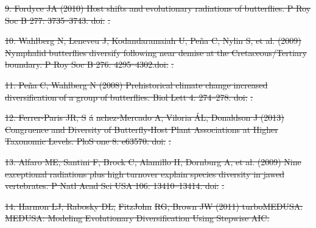 \documentclass[10pt]{article}
\providecommand{\DIFdeltex}[1]{{\protect\color{red}\sout{#1}}}                      %
\providecommand{\DIFaddbegin}{} %
\providecommand{\DIFaddend}{} %
\providecommand{\DIFdelend}{} %
\providecommand{\DIFdel}[1]{\texorpdfstring{\DIFdeltex{#1}}{}} %
\begin{document}
\DIFdel{9. Fordyce JA (2010) Host shifts and evolutionary radiations of
butterflies. P Roy Soc B 277: 3735--3743.
doi:}%
\DIFdel{.
}%

\DIFdel{10. Wahlberg N, Leneveu J, Kodandaramaiah U, Peña C, Nylin S, et al.
(2009) Nymphalid butterflies diversify following near demise at the
Cretaceous/Tertiary boundary. P Roy Soc B 276: 4295--4302.doi:}%
\DIFdel{.}%

\DIFdel{11. Peña C, Wahlberg N (2008)                                         Prehistorical climate change increased
diversification of a group of butterflies. Biol Lett 4: 274--278.
doi:}%
\DIFdel{.
}%

\DIFdel{12. Ferrer-Paris JR, S}%
\DIFdel{á}%
\DIFdel{nchez-Mercado A, Viloria ÁL, Donaldson J (2013)
Congruence and Diversity of Butterfly-Host Plant Associations at Higher
Taxonomic Levels. PloS one 8: e63570.
doi:}%
\DIFdel{.
}%

\DIFdel{13. Alfaro ME, Santini F, Brock C, Alamillo H, Dornburg A, et al. (2009)
Nine exceptional radiations plus high turnover explain species diversity
in jawed vertebrates. P Natl Acad Sci USA 106: 13410--13414.
doi:}%
\DIFdel{.
}%

\DIFdel{14. Harmon LJ, Rabosky DL, }%
\DIFdel{FitzJohn}%
\DIFdel{RG, Brown JW (2011) turboMEDUSA:
MEDUSA: Modeling Evolutionary Diversification Using Stepwise AIC.
}\DIFdelend %
\DIFaddbegin {}

\DIFaddend 
\end{document}
